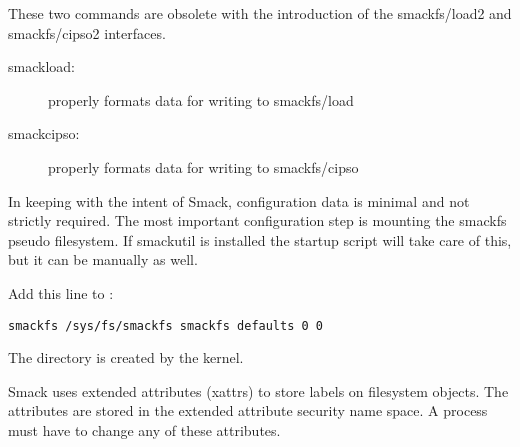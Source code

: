 \documentclass[a4paper,8pt,english]{sphinxmanual}
\begin{document}
These two commands are obsolete with the introduction of
the smackfs/load2 and smackfs/cipso2 interfaces.
\begin{description}
\item[{smackload:}] \leavevmode
properly formats data for writing to smackfs/load

\item[{smackcipso:}] \leavevmode
properly formats data for writing to smackfs/cipso

\end{description}

In keeping with the intent of Smack, configuration data is
minimal and not strictly required. The most important
configuration step is mounting the smackfs pseudo filesystem.
If smackutil is installed the startup script will take care
of this, but it can be manually as well.

Add this line to :

\begin{Verbatim}[commandchars=\\\{\}]
smackfs /sys/fs/smackfs smackfs defaults 0 0
\end{Verbatim}

The  directory is created by the kernel.

Smack uses extended attributes (xattrs) to store labels on filesystem
objects. The attributes are stored in the extended attribute security
name space. A process must have  to change any of these
attributes.
\end{document}
